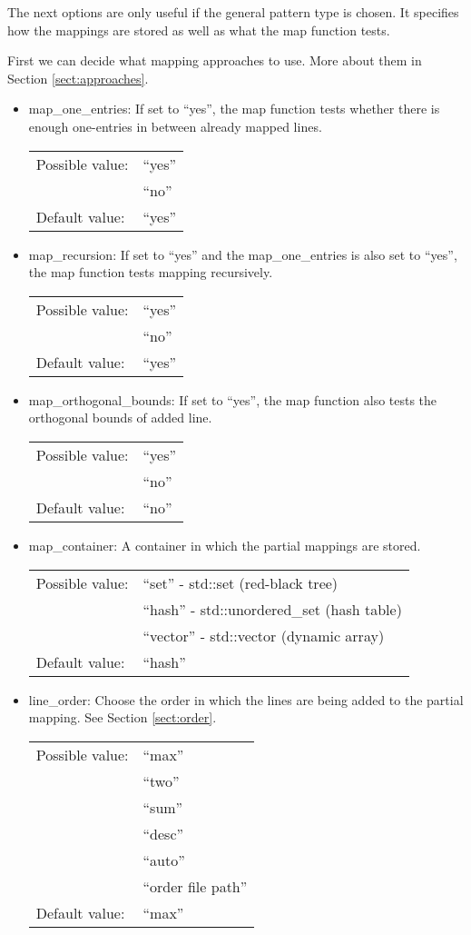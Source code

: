 The next options are only useful if the general pattern type is chosen. It specifies how the mappings are stored as well as what the map function tests.

First we can decide what mapping approaches to use. More about them in Section \ref{sect:approaches}.
\begin{itemize}
\item map\_one\_entries: If set to ``yes'', the map function  tests whether there is enough one-entries in between already mapped lines.

\begin{tabular}{ll}
Possible value: & ``yes'' \\
& ``no'' \\
Default value: & ``yes''
\end{tabular}

\item map\_recursion: If set to ``yes'' and the map\_one\_entries is also set to ``yes'', the map function tests mapping recursively.

\begin{tabular}{ll}
Possible value: & ``yes'' \\
& ``no'' \\
Default value: & ``yes''
\end{tabular}

\item map\_orthogonal\_bounds: If set to ``yes'', the map function also tests the orthogonal bounds of added line.

\begin{tabular}{ll}
Possible value: & ``yes'' \\
& ``no'' \\
Default value: & ``no''
\end{tabular}
\end{itemize}

\begin{itemize}
\item map\_container: A container in which the partial mappings are stored.

\begin{tabular}{ll}
Possible value: & ``set'' - std::set (red-black tree) \\
& ``hash'' - std::unordered\_set (hash table) \\
& ``vector'' - std::vector (dynamic array) \\
Default value: & ``hash''
\end{tabular}

\item line\_order: Choose the order in which the lines are being added to the partial mapping. See Section \ref{sect:order}.

\begin{tabular}{ll}
Possible value: & ``max'' \\
& ``two'' \\
& ``sum'' \\
& ``desc'' \\
& ``auto'' \\
& ``order file path'' \\
Default value: & ``max''
\end{tabular}

\end{itemize}
